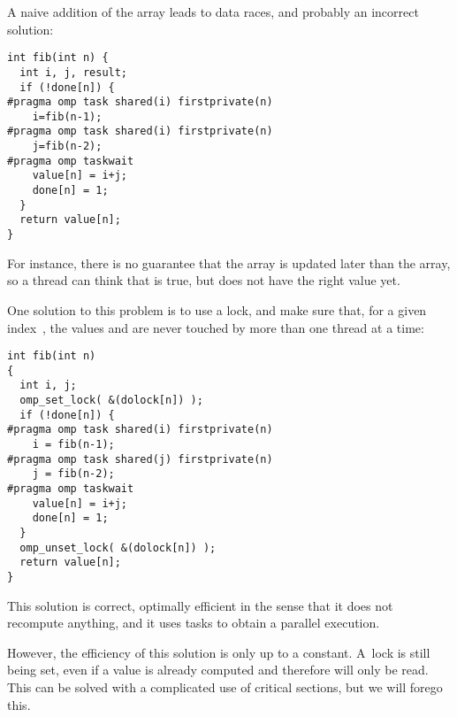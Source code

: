 A naive addition of the  array leads to data races, and probably an
incorrect solution:
\begin{lstlisting}
int fib(int n) {
  int i, j, result;
  if (!done[n]) {
#pragma omp task shared(i) firstprivate(n)
    i=fib(n-1);
#pragma omp task shared(i) firstprivate(n)
    j=fib(n-2);
#pragma omp taskwait
    value[n] = i+j;
    done[n] = 1;
  }
  return value[n];
}
\end{lstlisting}
For instance, there is no guarantee that the  array is updated
later than the  array, so a thread can think that 
is true, but  does not have the right value yet.

One solution to this problem is to use a lock, and make sure that,
for a given index~, the values  and 
are never touched by more than one thread at a time:
\begin{lstlisting}
int fib(int n)
{
  int i, j;
  omp_set_lock( &(dolock[n]) );
  if (!done[n]) {
#pragma omp task shared(i) firstprivate(n)
    i = fib(n-1);
#pragma omp task shared(j) firstprivate(n)
    j = fib(n-2);
#pragma omp taskwait
    value[n] = i+j;
    done[n] = 1;
  }
  omp_unset_lock( &(dolock[n]) );
  return value[n];
}
\end{lstlisting}
This solution is correct, optimally efficient in the sense that it
does not recompute anything, and it uses tasks to obtain a parallel execution.

However, the efficiency of this solution is only up to a constant.
A~lock is still being set, even if a value is already computed and therefore
will only be read. This can be solved with a complicated use of critical sections,
but we will forego this.



